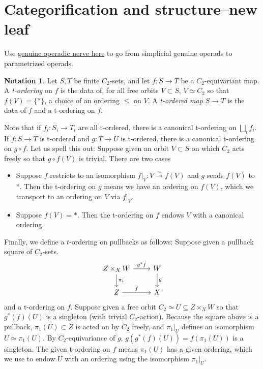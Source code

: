 \documentclass{article}
\theoremstyle{definition}
\newtheorem{notation}[equation]{Notation}
\begin{document}
\section{Categorification and structure--new leaf}
Use \href{https://arxiv.org/pdf/1904.01465}{genuine operadic nerve here} to go from simplicial genuine operads to parametrized operads. 
\begin{notation}\label{ntn:t_order_equivariant_map}
    Let $ S, T $ be finite $ C_2 $-sets, and let $ f \colon S\to T $ be a $ C_2 $-equivariant map. 
    A \emph{t-ordering} on $ f $ is the data of, for all free orbits $ V \subset S $, $ V \simeq C_2 $ so that $ f(V) = \{*\} $, a choice of an ordering $ \le $ on $ V $. 
    A \emph{t-ordered map $ S \to T $} is the data of $ f $ and a t-ordering on $ f $.  

    Note that if $ f_i \colon S_i \to T_i $ are all t-ordered, there is a canonical t-ordering on $ \displaystyle \bigsqcup_i f_i $. 
    If $ f \colon S \to T $ is t-ordered and $ g \colon T \to U $ is t-ordered, there is a canonical t-ordering on $ g \circ f $. 
    Let us spell this out: Suppose given an orbit $ V \subset S $ on which $ C_2 $ acts freely so that $ g\circ f(V) $ is trivial. 
    There are two cases
    \begin{itemize}
        \item Suppose $ f $ restricts to an isomorphism $ f|_V \colon V \xrightarrow{\sim} f(V) $ and $ g $ sends $ f(V) $ to $ * $. 
        Then the t-ordering on $ g $ means we have an ordering on $ f(V) $, which we transport to an ordering on $ V $ via $ f|_V $. 
        \item Suppose $ f(V) = * $. 
        Then the t-ordering on $ f $ endows $ V $ with a canonical ordering.  
    \end{itemize} 
    Finally, we define a $ t $-ordering on pullbacks as follows: Suppose given a pullback square of $ C_2 $-sets. 
    \begin{equation*}
    \begin{tikzcd}
        Z \times_X W \ar[r,"{g^*f}"] \ar[d,"{\pi_1}"] &  W \ar[d,"{g}"] \\
        Z \ar[r,"f"] & X        
    \end{tikzcd}     
    \end{equation*} 
    and a t-ordering on $ f $. 
    Suppose given a free orbit $ C_2 \simeq U \subseteq Z \times_X W $ so that $ g^*(f)(U) $ is a singleton (with trivial $ C_2 $-action). 
    Because the square above is a pullback, $ \pi_1(U) \subset Z $ is acted on by $ C_2 $ freely, and $ \pi_1|_U $ defines an isomorphism $ U \simeq \pi_1(U) $. 
    By $ C_2 $-equivariance of $ g $, $ g(g^*(f)(U)) = f(\pi_1(U)) $ is a singleton. 
    The given t-ordering on $ f $ means $ \pi_1(U) $ has a given ordering, which we use to endow $ U $ with an ordering using the isomorphism $ \pi_1|_U $. 
\end{notation}
\end{document}

